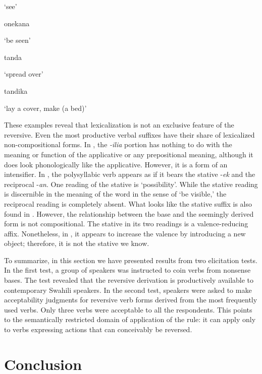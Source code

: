 \documentclass[output=paper]{langsci/langscibook}
\begin{document}
  ‘see’

\ex\label{ex:ngonyaningowa:12b}  
onekana

  ‘be seen’
\z 
\z 

\ea\label{ex:ngonyaningowa:13}
\ea\label{ex:ngonyaningowa:13a}
tanda

  ‘spread over’

\ex\label{ex:ngonyaningowa:13b}  
tandika

 ‘lay a cover, make (a bed)’
\z 
\z

These examples reveal that lexicalization is not an exclusive feature of the reversive. Even the most productive verbal suffixes have their share of lexicalized non-compositional forms. In , the \textit{-ilia} portion has nothing to do with the meaning or function of the applicative or any prepositional meaning, although it does look phonologically like the applicative. However, it is a form of an intensifier. In , the polysyllabic verb appears as if it bears the stative -\textit{ek} and the reciprocal -\textit{an}. One reading of the stative is ‘possibility’. While the stative reading is discernible in the meaning of the word in the sense of ‘be visible,’ the reciprocal reading is completely absent. What looks like the stative suffix is also found in . However, the relationship between the base  and the seemingly derived form  is not compositional. The stative in its two readings is a valence-reducing affix. Nonetheless, in , it appears to increase the valence by introducing a new object; therefore, it is not the stative we know. 

To summarize, in this section we have presented results from two elicitation tests. In the first test, a group of speakers was instructed to coin verbs from nonsense bases. The test revealed that the reversive derivation is productively available to contemporary Swahili speakers. In the second test, speakers were asked to make acceptability judgments for reversive verb forms derived from the most frequently used verbs. Only three verbs were acceptable to all the respondents. This points to the semantically restricted domain of application of the rule: it can apply only to verbs expressing actions that can conceivably be reversed.

\section{Conclusion}\label{sec:ngonyaningowa:6}
\end{document}
